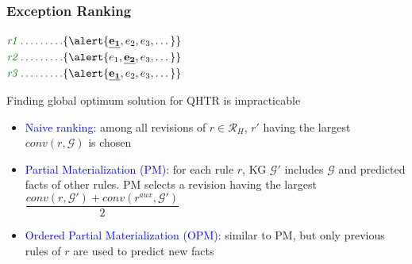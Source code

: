 \documentclass{beamer}
\newcommand{\bl}[1]{\textcolor{blue}{#1}}
\newcommand{\gr}[1]{\textcolor{darkgreen}{#1}}
\def\cG{\ensuremath{\mathcal{G}}}
\def\cR{\ensuremath{\mathcal{R}}}
\newcommand{\mi}[1]{\ensuremath{\mathit{#1}}}
\begin{document}
\begin{frame}\frametitle{Exception Ranking}

\begin{center}
$\gr{\mi{r1} \dotsc \dotsc \dotsc} \{\alert{\underline{\mathbf{e_1}},e_2,e_3, \dotsc}\}$\\
 $\gr{\mi{r2} \dotsc \dotsc \dotsc} \{\alert{e_1,\underline{\mathbf{e_2}},e_3, \dotsc}\}$\\
 $\gr{\mi{r3} \dotsc \dotsc \dotsc} \{\alert{\underline{\mathbf{e_1}},e_2,e_3, \dotsc}\}$\\
\end{center}
\bigskip
\begin{beamerboxesrounded}[upper=uppercolred,lower=lowercolred,shadow=true]{}
Finding global optimum solution for QHTR is impracticable
\end{beamerboxesrounded}
\begin{itemize}
\item \bl{Naive ranking:} among all revisions of $r\in \cR_{H}$, $r'$ having the largest $\mi{conv}(r,\cG)$ is chosen

\bigskip
\bigskip

\item \bl{Partial Materialization (PM):} for each rule $r$, KG $\cG'$ includes $\cG$ and predicted facts of other rules. PM selects a revision having the largest $\dfrac{\mi{conv(r,\cG')+conv(r^{aux},\cG')}}{2}$


\bigskip
\bigskip

\item \bl{Ordered Partial Materialization (OPM):} similar to PM, but only previous rules of $r$ are used to predict new facts
\end{itemize}

\end{frame}
\end{document}
